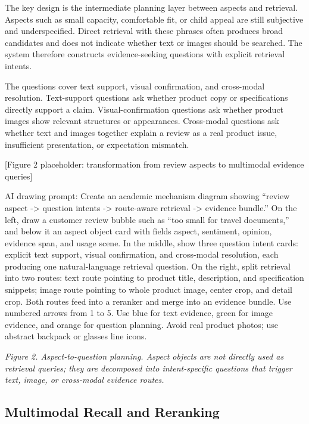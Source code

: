 \documentclass[11pt]{article}
\begin{document}
The key design is the intermediate planning layer between aspects and retrieval. Aspects such as small capacity, comfortable fit, or child appeal are still subjective and underspecified. Direct retrieval with these phrases often produces broad candidates and does not indicate whether text or images should be searched. The system therefore constructs evidence-seeking questions with explicit retrieval intents.

The questions cover text support, visual confirmation, and cross-modal resolution. Text-support questions ask whether product copy or specifications directly support a claim. Visual-confirmation questions ask whether product images show relevant structures or appearances. Cross-modal questions ask whether text and images together explain a review as a real product issue, insufficient presentation, or expectation mismatch.

{[}Figure 2 placeholder: transformation from review aspects to multimodal evidence queries{]}

AI drawing prompt: Create an academic mechanism diagram showing ``review aspect -\textgreater{} question intents -\textgreater{} route-aware retrieval -\textgreater{} evidence bundle.'' On the left, draw a customer review bubble such as ``too small for travel documents,'' and below it an aspect object card with fields aspect, sentiment, opinion, evidence span, and usage scene. In the middle, show three question intent cards: explicit text support, visual confirmation, and cross-modal resolution, each producing one natural-language retrieval question. On the right, split retrieval into two routes: text route pointing to product title, description, and specification snippets; image route pointing to whole product image, center crop, and detail crop. Both routes feed into a reranker and merge into an evidence bundle. Use numbered arrows from 1 to 5. Use blue for text evidence, green for image evidence, and orange for question planning. Avoid real product photos; use abstract backpack or glasses line icons.

\emph{Figure 2. Aspect-to-question planning. Aspect objects are not directly used as retrieval queries; they are decomposed into intent-specific questions that trigger text, image, or cross-modal evidence routes.}

\subsection{Multimodal Recall and Reranking}
\end{document}

